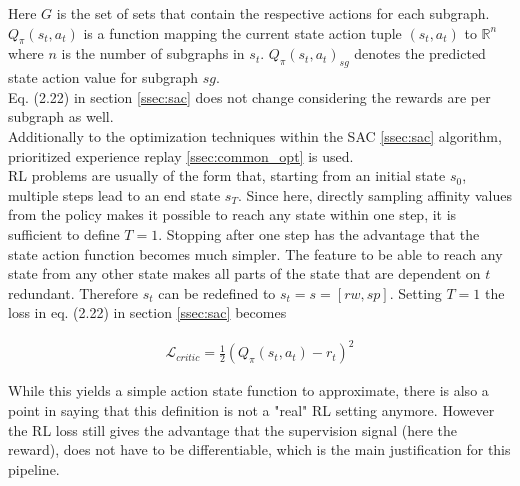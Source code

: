 Here $G$ is the set of sets that contain the respective actions for each subgraph. $Q_\pi(s_t, a_t)$ is a function mapping the current state action tuple $(s_t, a_t)$ to $\mathbb{R}^n$ where $n$ is the number of subgraphs in $s_t$. $Q_\pi(s_t, a_t)_{sg}$ denotes the predicted state action value for subgraph $sg$.\\
Eq. (2.22) in section \ref{ssec:sac} does not change considering the rewards are per subgraph as well.\\
Additionally to the optimization techniques within the SAC \ref{ssec:sac} algorithm, prioritized experience replay \ref{ssec:common_opt} is used.\\
RL problems are usually of the form that, starting from an initial state $s_0$, multiple steps lead to an end state $s_T$. Since here, directly sampling affinity values from the policy makes it possible to reach any state within one step, it is sufficient to define $T=1$. Stopping after one step has the advantage that the state action function becomes much simpler. The feature to be able to reach any state from any other state makes all parts of the state that are dependent on $t$ redundant. Therefore $s_t$ can be redefined to $s_t=s=[rw, sp]$. Setting $T=1$ the loss in eq. (2.22) in section \ref{ssec:sac} becomes

\begin{align}
	\mathcal{L}_{critic} = \frac{1}{2}(Q_{\pi}(s_t, a_t) - r_t) ^ 2
\end{align}

While this yields a simple action state function to approximate, there is also a point in saying that this definition is not a "real" RL setting anymore. However the RL loss still gives the advantage that the supervision signal (here the reward), does not have to be differentiable, which is the main justification for this pipeline.